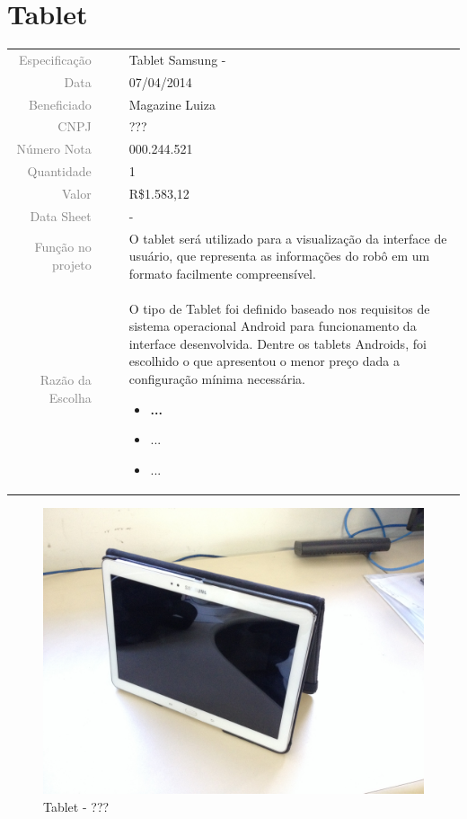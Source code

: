 

\section{Tablet}
\label{tablet}


\begin{table}[ht!]

	\begin{tabular}{r l|l p{12cm} }
		
		\textcolor{gray}{Especificação} &&& 	{Tablet Samsung - }\\
		\textcolor{gray}{Data} &&& 				{07/04/2014}\\
        \textcolor{gray}{Beneficiado} &&&		{Magazine Luiza} \\
        \textcolor{gray}{CNPJ} &&& 				{???} \\
        \textcolor{gray}{Número Nota} &&& 		{000.244.521} \\
		\textcolor{gray}{Quantidade} &&& 		{1} \\
		\textcolor{gray}{Valor} &&& 			{R\$1.583,12} \\
		\textcolor{gray}{Data Sheet} &&& 		{-} \\

		\textcolor{gray}{Função no projeto} &&& {O tablet será utilizado para a visualização da interface de usuário, que representa as informações do robô em um formato facilmente compreensível.} \\
		\textcolor{gray}{Razão da Escolha} &&& {O tipo de Tablet foi definido baseado nos requisitos de sistema operacional Android para funcionamento da interface desenvolvida. Dentre os tablets Androids, foi escolhido o que apresentou o menor preço dada a configuração mínima necessária.  

		\begin{itemize}
		  \item \textbf{...} 
		  \item ...
		  \item ...
		\end{itemize}}
		

	\end{tabular}
\end{table}

\newpage

\begin{figure}[h!]
 \centering
 \includegraphics[width=1\columnwidth]{Tablet/foto}
 \caption{Tablet - ??? }
\end{figure}